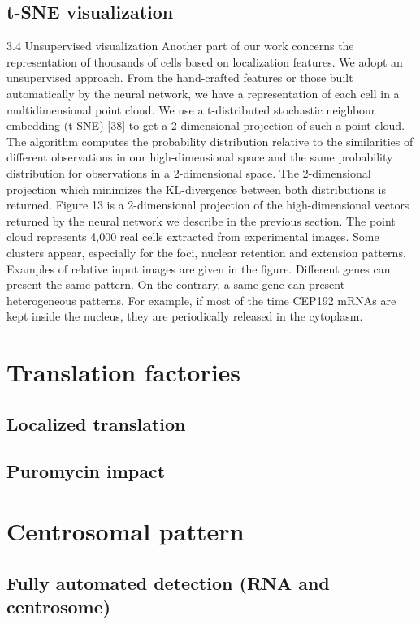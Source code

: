 \subsection{t-SNE visualization}

3.4 Unsupervised visualization
Another part of our work concerns the representation of thousands of cells
based on localization features. We adopt an unsupervised approach. From the
hand-crafted features or those built automatically by the neural network, we
have a representation of each cell in a multidimensional point cloud. We use
a t-distributed stochastic neighbour embedding (t-SNE) [38] to get a 2-dimensional
projection of such a point cloud. The algorithm computes the probability distribution
relative to the similarities of different observations in our high-dimensional
space and the same probability distribution for observations in a 2-dimensional
space. The 2-dimensional projection which minimizes the KL-divergence between
both distributions is returned. Figure 13 is a 2-dimensional projection of the
high-dimensional vectors returned by the neural network we describe in the
previous section. The point cloud represents 4,000 real cells extracted from
experimental images. Some clusters appear, especially for the foci, nuclear
retention and extension patterns. Examples of relative input images are given
in the figure. Different genes can present the same pattern. On the contrary,
a same gene can present heterogeneous patterns. For example, if most of the
time CEP192 mRNAs are kept inside the nucleus, they are periodically released
in the cytoplasm.

\section{Translation factories}


\subsection{Localized translation}

\subsection{Puromycin impact}


\section{Centrosomal pattern}


\subsection{Fully automated detection (\ac{RNA} and centrosome)}

